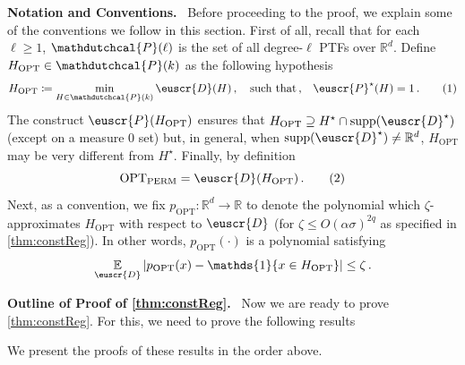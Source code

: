 \documentclass[11pt]{article}
\theoremstyle{plain}
\theoremstyle{definition}
\theoremstyle{remark}
\newcommand{\yesnum}{\addtocounter{equation}{1}\tag{\theequation}}
\newcommand{\quadtext}[1]{\quad\text{#1}\quad}
\def\abs#1{\left| #1 \right|}
\newcommand{\sinparen}[1]{(#1)}
\newcommand{\sinbrace}[1]{\{#1\}}
\newcommand{\R}{\mathbb{R}}
\newcommand{\E}{\operatornamewithlimits{\mathbb{E}}}
\newcommand{\Ex}{\E}
\newcommand{\nfrac}[2]{\nicefrac{#1}{#2}}
\newcommand{\opt}{\ensuremath{\mathrm{OPT}}}
\newcommand{\supp}{\operatorname{supp}}
\newcommand{\customcal}[1]{\euscr{#1}}
\newcommand{\cD}{\customcal{D}}
\newcommand{\cP}{\customcal{P}}
\renewcommand{\paragraph}[1]{\medskip \noindent\textbf{#1}~}
\newcommand{\hypo}[1]{\mathdutchcal{#1}}
\newcommand{\hyP}{\hypo{P}}
\newcommand{\optset}{{H^\star}}
\newcommand{\cDtrue}{\cD^\star}
\newcommand{\cDgiven}{\cD}
\newcommand{\cPtrue}{\cP^\star}
\begin{document}
        \medskip 
        \paragraph{Notation and Conventions.}
        Before proceeding to the proof, we explain some of the conventions we follow in this section.
        First of all, recall that for each $\ell\geq 1$, $\hyP(\ell)$ is the set of all degree-$\ell$ PTFs over $\R^d$.
        Define $H_{\opt}\in \hyP(k)$ as the following hypothesis 
        \[
            H_{\opt} \coloneqq 
                \min_{H\in \hyP(k)} \cD(H)\,, 
                \quadtext{such that\,,}
                    \cPtrue(H) = 1
                    \,.
                    \yesnum\label{eq:constReg:optimalSolution}
        \]
        The construct $\cP(H_{\opt})$ ensures that $H_{\opt}\supseteq \optset\cap \supp(\cDtrue)$ (except on a measure 0 set) but, in general, when $\supp(\cDtrue)\neq \R^d$, $H_{\opt}$ may be very different from $\optset$.
        Finally, by definition
        \[
            \opt_{\rm PERM} = \cD(H_{\opt})\,.
            \yesnum\label{eq:constReg:expectedValue:defOPT}
        \]
        Next, as a convention, we fix $p_{\opt}\colon \R^d\to \R$ to denote the polynomial which $\zeta$-approximates $H_{\opt}$ with respect to $\cDgiven$ (for $\zeta\leq O\sinparen{{\alpha\sigma}{}}^{2q}$ as specified in \cref{thm:constReg}).
        In other words, $p_{\opt}(\cdot)$ is a polynomial satisfying 
        \[
            \Ex_{\cDgiven}\abs{p_{\opt}(x) - \mathds{1}\sinbrace{x\in H_{\opt}}}\leq \zeta\,.
        \]
        

        \paragraph{Outline of Proof of \cref{thm:constReg}.}
        Now we are ready to prove \cref{thm:constReg}.
        For this, we need to prove the following results 
        We present the proofs of these results in the order above. 
\end{document}
